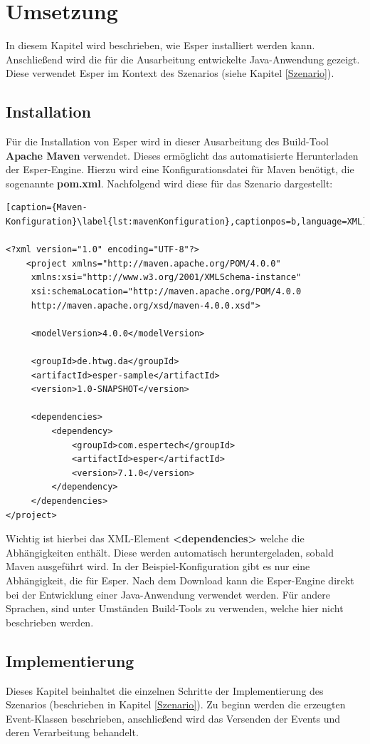 \chapter{Umsetzung}
In diesem Kapitel wird beschrieben, wie Esper installiert werden kann. Anschließend wird die für die Ausarbeitung entwickelte Java-Anwendung gezeigt. Diese verwendet Esper im Kontext des Szenarios (siehe Kapitel \ref{Szenario}).

\section{Installation}
Für die Installation von Esper wird in dieser Ausarbeitung des Build-Tool \textbf{Apache Maven} verwendet. 
Dieses ermöglicht das automatisierte Herunterladen der Esper-Engine. Hierzu wird eine Konfigurationsdatei für Maven benötigt, die sogenannte \textbf{pom.xml}. Nachfolgend wird diese für das Szenario dargestellt:

\begin{lstlisting}[caption={Maven-Konfiguration}\label{lst:mavenKonfiguration},captionpos=b,language=XML]

<?xml version="1.0" encoding="UTF-8"?>
    <project xmlns="http://maven.apache.org/POM/4.0.0"
     xmlns:xsi="http://www.w3.org/2001/XMLSchema-instance"
     xsi:schemaLocation="http://maven.apache.org/POM/4.0.0
     http://maven.apache.org/xsd/maven-4.0.0.xsd">
		
     <modelVersion>4.0.0</modelVersion>

     <groupId>de.htwg.da</groupId>
     <artifactId>esper-sample</artifactId>
     <version>1.0-SNAPSHOT</version>

     <dependencies>
         <dependency>
             <groupId>com.espertech</groupId>
             <artifactId>esper</artifactId>
             <version>7.1.0</version>
         </dependency>
     </dependencies>
</project>

\end{lstlisting}
Wichtig ist hierbei das XML-Element \textbf{<dependencies>} welche die Abhängigkeiten enthält. Diese werden automatisch heruntergeladen, sobald Maven ausgeführt wird. In der Beispiel-Konfiguration gibt es nur eine Abhängigkeit, die für Esper.
\absatz
Nach dem Download kann die Esper-Engine direkt bei der Entwicklung einer Java-Anwendung verwendet werden. Für andere Sprachen, sind unter Umständen Build-Tools zu verwenden, welche hier nicht beschrieben werden.

\section{Implementierung}
Dieses Kapitel beinhaltet die einzelnen Schritte der Implementierung des Szenarios (beschrieben in Kapitel \ref{Szenario}). Zu beginn werden die erzeugten Event-Klassen beschrieben, anschließend wird das Versenden der Events und deren Verarbeitung behandelt.

